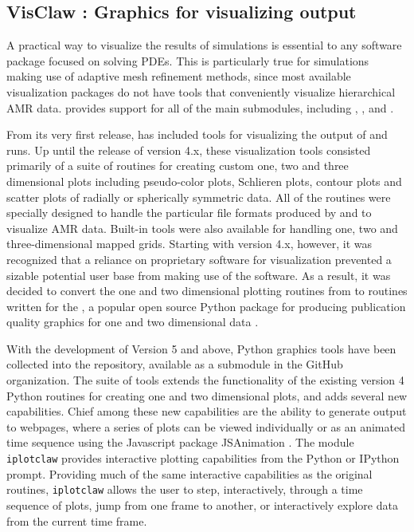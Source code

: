 %
%
%

\subsection{VisClaw : Graphics for visualizing \clawpack output}
A practical way to visualize the results of simulations is
essential to any software package focused on solving PDEs.
This is particularly true for simulations making use of adaptive mesh
refinement methods, since most available visualization packages do not
have tools that conveniently visualize hierarchical AMR data.  \visclaw provides 
support for all of the main \clawpack submodules, including
\classic, \amrclaw, \pyclaw and \geoclaw.

From its very first release,
\clawpack has included tools for visualizing the output of \clawpack and
\amrclaw runs.  Up until the release of version \clawpack 4.x, these
visualization tools consisted primarily of a suite of \mlab routines
for creating custom one, two and three dimensional plots including
pseudo-color plots, Schlieren plots, contour plots and scatter plots
of radially or spherically symmetric data. All of the routines were
specially designed to handle the particular file formats produced by
\clawpack and to visualize AMR data.  Built-in tools were also available
for handling one, two and three-dimensional mapped grids.
Starting with version 4.x, however, it was recognized that a reliance
on proprietary software for visualization prevented a sizable
potential user base from making use of the \clawpack software.  As a
result, it was decided to convert the one and two dimensional plotting
routines from \mlab to routines written for the \mplotlib,
a popular open source
Python package for producing publication quality graphics
for one and two dimensional data \cite{Hunter:2007}.

With the development of \clawpack Version 5 and above, Python graphics tools
have been collected into the \visclaw repository, available as a
submodule in the
\clawpack GitHub organization.  The \visclaw suite of tools extends the
functionality of the existing version 4 Python routines for creating one and
two dimensional plots, and adds several new capabilities.  Chief among
these new capabilities are the ability to generate output to webpages,
where a series of plots can be viewed individually or as an animated
time sequence using the Javascript package {\sc JSAnimation}
\cite{jsanimation}.
The \visclaw module {\tt iplotclaw} provides
interactive plotting capabilities from the Python or IPython prompt.
Providing much of the same interactive capabilities as the original
\mlab routines, {\tt iplotclaw} allows the user to step,
interactively, through a time sequence of plots, jump from one frame
to another, or interactively explore data from the current time frame.

